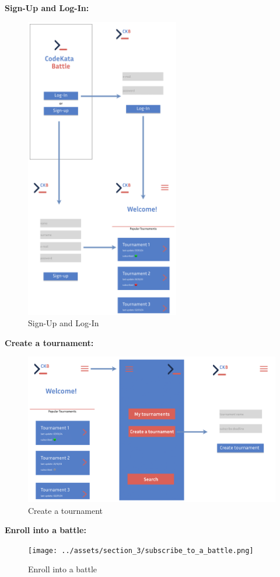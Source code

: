 \documentclass[../DD.tex]{subfiles}
\begin{document}
    \textbf{Sign-Up and Log-In:}
    \begin{figure}[h!]
        \centering
        \hspace*{-3cm}
        \includegraphics[width=0.6\textwidth]{../assets/section_3/login_and_sign-up.png}
        \caption{Sign-Up and Log-In}
    \end{figure}
    \newpage
    \restoregeometry

    \textbf{Create a tournament:}
    \begin{figure}[h!]
        \centering
        \hspace*{-3cm}
        \includegraphics[width=1.4\textwidth]{../assets/section_3/create_a_tournament.png}
        \caption{Create a tournament}
    \end{figure}
    \newpage

    \textbf{Enroll into a battle:}
    \begin{figure}[h!]
        \centering
        \hspace*{-3cm}
        \texttt{[image: ../assets/section\_3/subscribe\_to\_a\_battle.png]}
        \caption{Enroll into a battle}
    \end{figure}
\end{document}
